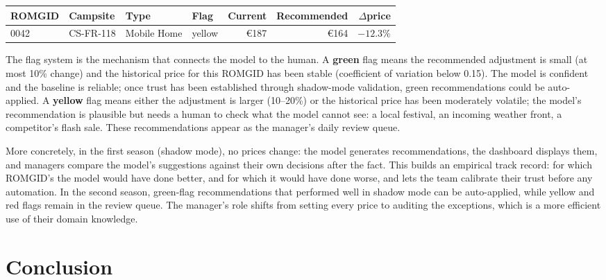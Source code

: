 \documentclass[11pt,a4paper]{article}
\begin{document}
\begin{center}
\small
\begin{tabular}{@{}llllrrr@{}}
\toprule
\textbf{ROMGID} & \textbf{Campsite} & \textbf{Type} & \textbf{Flag} & \textbf{Current} & \textbf{Recommended} & \textbf{$\Delta$price} \\
\midrule
0042 & CS-FR-118 & Mobile Home & \colorbox{accent4!25}{yellow} & \euro{}187 & \euro{}164 & $-12.3\%$ \\
\bottomrule
\end{tabular}
\end{center}
 
The flag system is the mechanism that connects the model to the human.  A
\textbf{green} flag means the recommended adjustment is small (at most 10\%
change) and the historical price for this ROMGID has been stable (coefficient
of variation below 0.15).  The model is confident and the baseline is reliable;
once trust has been established through shadow-mode validation, green
recommendations could be auto-applied.  A \textbf{yellow} flag means either the
adjustment is larger (10--20\%) or the historical price has been moderately
volatile; the model's recommendation is plausible but needs a human to check
what the model cannot see: a local festival, an incoming weather front, a
competitor's flash sale.  These recommendations appear as the manager's daily
review queue.
 
More concretely, in the first season (shadow mode), no prices change: the
model generates recommendations, the dashboard displays them, and managers
compare the model's suggestions against their own decisions after the fact.
This builds an empirical track record: for which ROMGID's the model would
have done better, and for which it would have done worse, and lets the team
calibrate their trust before any automation.  In the second season, green-flag
recommendations that performed well in shadow mode can be auto-applied, while
yellow and red flags remain in the review queue.  The manager's role shifts
from setting every price to auditing the exceptions, which is a more efficient
use of their domain knowledge. 
 
\section{Conclusion}
 
\end{document}
